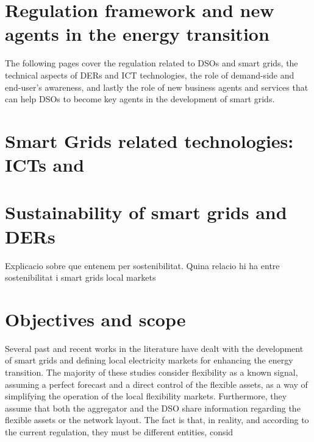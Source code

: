 %
%
%


\section{Regulation framework and new agents in the energy transition}

The following pages cover the regulation related to DSOs and smart grids, the technical aspects of DERs and ICT technologies, the role of demand-side and end-user's awareness, and lastly the role of new business agents and services that can help DSOs to become key agents in the development of smart grids. 



\section{Smart Grids related technologies: ICTs and }

\section{Sustainability of smart grids and DERs}
Explicacio sobre que entenem per sostenibilitat. Quina relacio hi ha entre sostenibilitat i smart grids local markets 


\newpage 
\section{Objectives and scope}
Several past and recent works in the literature have dealt with the development of smart grids and defining local electricity markets for enhancing the energy transition. The majority of these studies consider flexibility as a known signal, assuming a perfect forecast and a direct control of the flexible assets, as a way of simplifying the operation of the local flexibility markets. Furthermore, they assume that both the aggregator and the DSO share information regarding the flexible assets or the network layout. The fact is that, in reality, and according to the current regulation, they must be different entities, consid 


